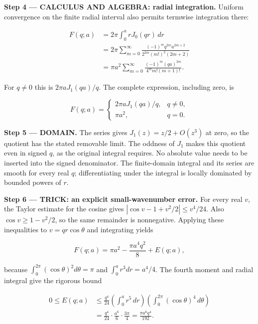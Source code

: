 \documentclass[11pt,oneside,openany]{book}
\begin{document}
\textbf{Step 4 --- CALCULUS AND ALGEBRA: radial integration.} Uniform convergence on the finite radial interval also permits termwise integration there:

\[
\begin{aligned}
F(q;a)&=2\pi\int_0^a r J_0(qr)\,dr\\
&=2\pi\sum_{m=0}^\infty
\frac{(-1)^m q^{2m}a^{2m+2}}{2^{2m}(m!)^2(2m+2)}\\
&=\pi a^2\sum_{m=0}^\infty
\frac{(-1)^m(qa)^{2m}}{4^m m!(m+1)!}.
\end{aligned}
\]

For \(q\ne0\) this is \(2\pi aJ_1(qa)/q\). The complete expression, including zero, is

\[
F(q;a)=\begin{cases}
2\pi aJ_1(qa)/q,&q\ne0,\\
\pi a^2,&q=0.
\end{cases}
\]

\begin{DomainStep}
\textbf{Step 5 --- DOMAIN.} The series gives \(J_1(z)=z/2+O(z^3)\) at zero, so the quotient has the stated removable limit. The oddness of \(J_1\) makes this quotient even in signed \(q\), as the original integral requires. No absolute value needs to be inserted into the signed denominator. The finite-domain integral and its series are smooth for every real \(q\); differentiating under the integral is locally dominated by bounded powers of \(r\).

\end{DomainStep}
\begingroup\color{TrickPurple}
\textbf{Step 6 --- TRICK: an explicit small-wavenumber error.} For every real \(v\), the Taylor estimate for the cosine gives \(|\cos v-1+v^2/2|\le v^4/24\). Also \(\cos v\ge1-v^2/2\), so the same remainder is nonnegative. Applying these inequalities to \(v=qr\cos\theta\) and integrating yields

\[
F(q;a)=\pi a^2-\frac{\pi a^4q^2}{8}+E(q;a),
\]

because \(\int_0^{2\pi}(\cos\theta)^2d\theta=\pi\) and \(\int_0^a r^3dr=a^4/4\). The fourth moment and radial integral give the rigorous bound

\[
\begin{aligned}
0\le E(q;a)
&\le\frac{q^4}{24}\left(\int_0^a r^5\,dr\right)
\left(\int_0^{2\pi}(\cos\theta)^4\,d\theta\right)\\
&=\frac{q^4}{24}\cdot\frac{a^6}{6}\cdot\frac{3\pi}{4}
=\frac{\pi a^6q^4}{192}.
\end{aligned}
\]
\end{document}
